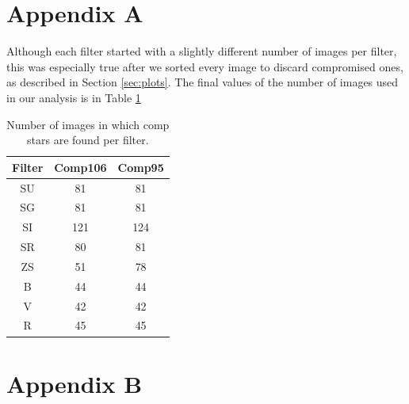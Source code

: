 \documentclass[linenumbers]{aastex631}
\begin{document}

%


%

\appendix

\section{Appendix A} \label{appa}
Although each filter started with a slightly different number of images per filter, this was especially true after we sorted every image to discard compromised ones, as described in Section \ref{sec:plots}. The final values of the number of images used in our analysis is in Table \ref{tab:numimg}

\begin{table}[H]
    \centering
    \begin{tabular}{ | c | c | c | }
    \hline
        Filter & Comp106 & Comp95 \\ \hline \hline
        SU & 81 & 81 \\ \hline
        SG & 81 & 81 \\ \hline
        SI & 121 & 124 \\ \hline
        SR & 80 & 81 \\ \hline
        ZS & 51 & 78 \\ \hline
        B & 44 & 44 \\ \hline
        V & 42 & 42 \\ \hline
        R & 45 & 45 \\ \hline
    \end{tabular}
    \caption{Number of images in which comp stars are found per filter.}
    \label{tab:numimg}
\end{table}

\section{Appendix B} \label{appb}
\end{document}
